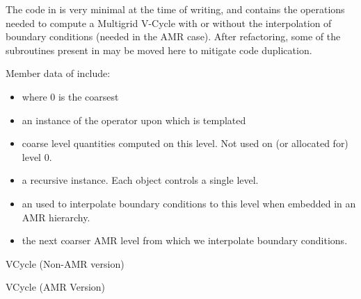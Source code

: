 \documentclass[12pt,a4paper]{article}
\begin{document}
The code in  is very minimal at the time of writing, and contains the operations needed to compute a Multigrid V-Cycle with or without the interpolation of boundary conditions (needed in the AMR case). After refactoring, some of the subroutines present in  may be moved here to mitigate code duplication.

Member data of  include:
\begin{itemize}
\item {} where 0 is the coarsest 
\item {} an instance of the operator upon which  is templated
\item {} coarse level quantities computed on this level. Not used on (or allocated for) level 0. 
\item {} a recursive  instance. Each  object controls a single level.
\item {} an  used to interpolate boundary conditions to this level when embedded in an AMR hierarchy. 
\item {} the next coarser AMR level from which we interpolate boundary conditions. 
\end{itemize}

\begin{algorithm}
\caption{VCycle (Non-AMR version)}
\begin{algorithmic}[1]
\Else
\EndIf
\EndProcedure
\end{algorithmic}
\end{algorithm}

\begin{algorithm}
\caption{VCycle (AMR Version)}
\begin{algorithmic}[1]
\Else
\EndIf
\EndProcedure
\end{algorithmic}
\end{algorithm}
\pagebreak
\end{document}
